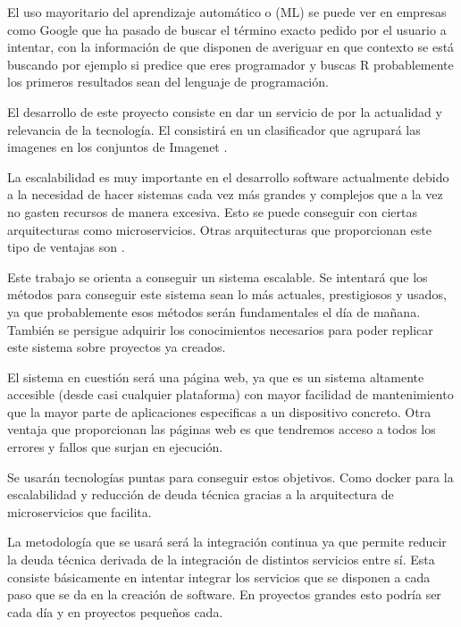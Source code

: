 

El uso mayoritario del aprendizaje automático o  (ML) se puede ver en empresas como Google que ha pasado de buscar el término exacto pedido por el usuario a intentar, con la información de que disponen de averiguar en que contexto se está buscando por ejemplo si predice que eres programador y buscas R probablemente los primeros resultados sean del lenguaje de programación.

El desarrollo de este proyecto consiste en dar un servicio de  por la actualidad y relevancia de la tecnología. El consistirá en un clasificador que agrupará las imagenes en los conjuntos de Imagenet \cite{imnet}.

La escalabilidad es muy importante en el desarrollo software actualmente debido a la necesidad de hacer sistemas cada vez más grandes y complejos que a la vez no gasten recursos de manera excesiva. Esto se puede conseguir con ciertas arquitecturas como microservicios. Otras arquitecturas que proporcionan este tipo de ventajas son  \cite{svlops, svless}.

Este trabajo se orienta a conseguir un sistema escalable. Se intentará que los métodos para conseguir este sistema sean lo más actuales, prestigiosos y usados, ya que probablemente esos métodos serán fundamentales el día de mañana. También se persigue adquirir los conocimientos necesarios para poder replicar este sistema sobre proyectos ya creados.

El sistema en cuestión será una página web, ya que es un sistema altamente accesible (desde casi cualquier plataforma) con mayor facilidad de mantenimiento que la mayor parte de aplicaciones especificas a un dispositivo concreto. Otra ventaja que proporcionan las páginas web es que tendremos acceso a todos los errores y fallos que surjan en ejecución.

Se usarán tecnologías puntas para conseguir estos objetivos. Como docker para la escalabilidad y reducción de deuda técnica gracias a la arquitectura de microservicios que facilita.

La metodología que se usará será la integración continua ya que permite reducir la deuda técnica derivada de la integración de distintos servicios entre sí. Esta consiste básicamente en intentar integrar los servicios que se disponen a cada paso que se da en la creación de software. En proyectos grandes esto podría ser cada día y en proyectos pequeños cada.
